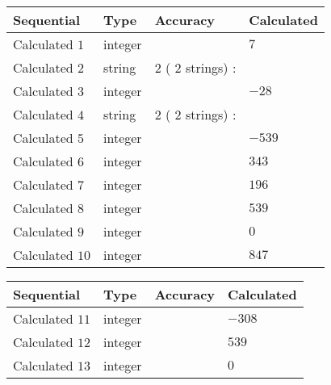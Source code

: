 \documentclass[12pt]{article}
\begin{document}
  
\noindent\begin{tabular}{|l|l|l|l|}
\hline
 Sequential & Type & Accuracy & Calculated \\ 
\hline
 
 
  Calculated $           1$ & integer &  & 
  $ 7 $ 
 \\  \hline  
 
 
  Calculated $           2$ & string & $           2 $ ( $          2 $ strings)
 : 
 & 
 \\  \hline  
 
 
  Calculated $           3$ & integer &  & 
  $ -28 $ 
 \\  \hline  
 
 
  Calculated $           4$ & string & $           2 $ ( $          2 $ strings)
 : 
 & 
 \\  \hline  
 
 
  Calculated $           5$ & integer &  & 
  $ -539 $ 
 \\  \hline  
 
 
  Calculated $           6$ & integer &  & 
  $ 343 $ 
 \\  \hline  
 
 
  Calculated $           7$ & integer &  & 
  $ 196 $ 
 \\  \hline  
 
 
  Calculated $           8$ & integer &  & 
  $ 539 $ 
 \\  \hline  
 
 
  Calculated $           9$ & integer &  & 
  $ 0 $ 
 \\  \hline  
 
 
  Calculated $          10$ & integer &  & 
  $ 847 $ 
 \\  \hline  
 \end{tabular}
   
   
  
  
\noindent\begin{tabular}{|l|l|l|l|}
\hline
 Sequential & Type & Accuracy & Calculated \\ 
\hline
 
 
  Calculated $          11$ & integer &  & 
  $ -308 $ 
 \\  \hline  
 
 
  Calculated $          12$ & integer &  & 
  $ 539 $ 
 \\  \hline  
 
 
  Calculated $          13$ & integer &  & 
  $ 0 $ 
 \\  \hline  
 \end{tabular}
   
\end{document}
